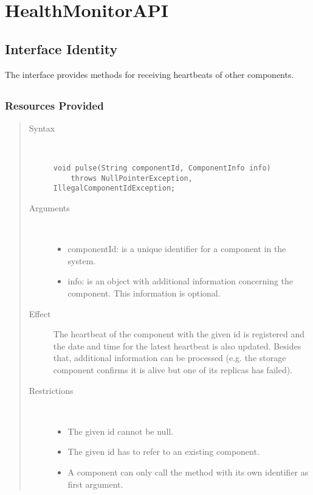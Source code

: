 \section{HealthMonitorAPI}
\label{api:health-monitoring-unit-api}

\subsection{Interface Identity}

\npar The  interface provides methods for
receiving heartbeats of other components.

\subsection{}

\subsubsection{Resources Provided}

\begin{quote}
	\begin{description}
		\item[Syntax] \
		\begin{verbatim}
void pulse(String componentId, ComponentInfo info)
    throws NullPointerException, IllegalComponentIdException;
		\end{verbatim}
		\item[Arguments] \
		\begin{itemize}
		  \item componentId: is a unique identifier for a component in the system.
		  \item info: is an object with additional information concerning the
		  component. This information is optional.
		\end{itemize}
		\item[Effect] The heartbeat of the component with the given id is registered
		and the date and time for the latest heartbeat is also updated. Besides that,
		additional information can be processed (e.g. the storage component confirms
		it is alive but one of its replicas has failed).
		\item[Restrictions] \
		\begin{itemize}
		  \item The given id cannot be null.
		  \item The given id has to refer to an existing component.
		  \item A component can only call the  method with its own
		  identifier as first argument. 
		\end{itemize}
	\end{description} 
\end{quote}


